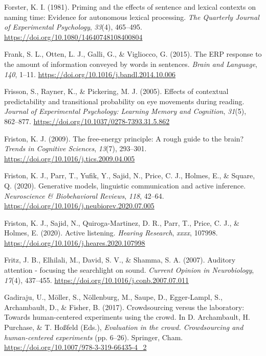 \documentclass[a4paper, nobind]{templates/ociamthesis}
\newlength{\cslhangindent}
\newenvironment{CSLReferences}[2] %
 {%
  \setlength{\parindent}{0pt}
  \ifodd #1
  \let\oldpar\par
  \def\par{\hangindent=\cslhangindent\oldpar}
  \fi
  \setlength{\parskip}{1mm}
  \setlength{\baselineskip}{6mm}
 }%
 {}
\begin{document}
\begin{CSLReferences}{1}{0}
\leavevmode{}%
Forster, K. I. (1981). Priming and the effects of sentence and lexical contexts on naming time: Evidence for autonomous lexical processing. \emph{The Quarterly Journal of Experimental Psychology}, \emph{33}(4), 465--495. \url{https://doi.org/10.1080/14640748108400804}

\leavevmode{}%
Frank, S. L., Otten, L. J., Galli, G., \& Vigliocco, G. (2015). {The ERP response to the amount of information conveyed by words in sentences}. \emph{Brain and Language}, \emph{140}, 1--11. \url{https://doi.org/10.1016/j.bandl.2014.10.006}

\leavevmode{}%
Frisson, S., Rayner, K., \& Pickering, M. J. (2005). {Effects of contextual predictability and transitional probability on eye movements during reading}. \emph{Journal of Experimental Psychology: Learning Memory and Cognition}, \emph{31}(5), 862--877. \url{https://doi.org/10.1037/0278-7393.31.5.862}

\leavevmode{}%
Friston, K. J. (2009). The free-energy principle: A rough guide to the brain? \emph{Trends in Cognitive Sciences}, \emph{13}(7), 293--301. \url{https://doi.org/10.1016/j.tics.2009.04.005}

\leavevmode{}%
Friston, K. J., Parr, T., Yufik, Y., Sajid, N., Price, C. J., Holmes, E., \& Square, Q. (2020). {Generative models, linguistic communication and active inference}. \emph{Neuroscience {\&} Biobehavioral Reviews}, \emph{118}, 42--64. \url{https://doi.org/10.1016/j.neubiorev.2020.07.005}

\leavevmode{}%
Friston, K. J., Sajid, N., Quiroga-Martinez, D. R., Parr, T., Price, C. J., \& Holmes, E. (2020). {Active listening}. \emph{Hearing Research}, \emph{xxxx}, 107998. \url{https://doi.org/10.1016/j.heares.2020.107998}

\leavevmode{}%
Fritz, J. B., Elhilali, M., David, S. V., \& Shamma, S. A. (2007). {Auditory attention - focusing the searchlight on sound}. \emph{Current Opinion in Neurobiology}, \emph{17}(4), 437--455. \url{https://doi.org/10.1016/j.conb.2007.07.011}

\leavevmode{}%
Gadiraju, U., Möller, S., Nöllenburg, M., Saupe, D., Egger-Lampl, S., Archambault, D., \& Fisher, B. (2017). {Crowdsourcing versus the laboratory: Towards human-centered experiments using the crowd}. In D. Archambault, H. Purchase, \& T. Hoßfeld (Eds.), \emph{Evaluation in the crowd. Crowdsourcing and human-centered experiments} (pp. 6--26). Springer, Cham. \url{https://doi.org/10.1007/978-3-319-66435-4_2}


\end{CSLReferences}
\end{document}
